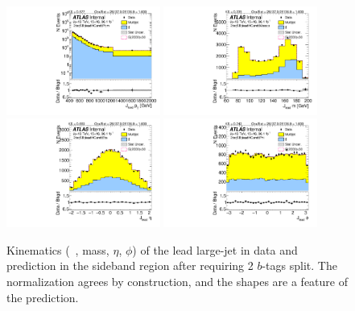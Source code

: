 \clearpage

\begin{figure}[htbp!]
\begin{center}
\includegraphics[width=0.45\textwidth,angle=-90]{figures/boosted/Sideband/b77_TwoTag_split_Sideband_leadHCand_Pt_m_1.pdf}
\includegraphics[width=0.45\textwidth,angle=-90]{figures/boosted/Sideband/b77_TwoTag_split_Sideband_leadHCand_Mass_s.pdf}\\
\includegraphics[width=0.45\textwidth,angle=-90]{figures/boosted/Sideband/b77_TwoTag_split_Sideband_leadHCand_Eta.pdf}
\includegraphics[width=0.45\textwidth,angle=-90]{figures/boosted/Sideband/b77_TwoTag_split_Sideband_leadHCand_Phi.pdf}
  \caption{Kinematics (\pt~, mass, $\eta$, $\phi$) of the lead large-\R jet in data and prediction in the sideband region after requiring 2 $b$-tags split. The normalization agrees by construction, and the shapes are a feature of the prediction.}
  \label{fig:boosted-2bs-sideband-ak10-lead}
\end{center}
\end{figure}

